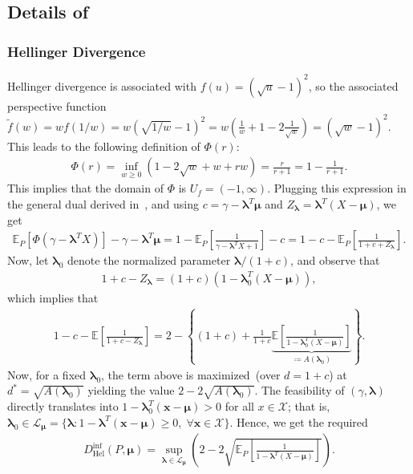 \documentclass{article}
\theoremstyle{plain}
\theoremstyle{definition}
\newcommand{\lrp}[1]{\left( #1 \right)}
\newcommand{\calX}{\mathcal X}
\newcommand{\calL}{\mathcal L}
\newcommand{\xvec}{\mathbf{x}}
\newcommand{\boldlambda}{\boldsymbol{\lambda}}
\newcommand{\boldmu}{\boldsymbol{\mu}}
\newcommand{\ftilde}{\widetilde{f}}
\begin{document}
\subsection{Details of }
\label{proof:corollary-f-divergence}

\subsubsection{Hellinger Divergence}
\label{proof:corollary-Hellinger}
Hellinger divergence is associated with $f(u) = (\sqrt{u} - 1)^2$, so the associated perspective function $\ftilde(w) = w f(1/w) = w (\sqrt{1/w} - 1)^2 = w \lrp{\frac 1 w + 1 - 2 \frac 1 {\sqrt{w}} } = (\sqrt{w} -1)^2$. This leads to the following definition of $\Phi(r)$: 
\begin{align}
    \Phi(r) = \inf_{w \geq 0} \lrp{1 - 2 \sqrt{w} + w + rw } = \frac{r}{r+1} = 1 - \frac{1}{r+1}.  
\end{align}
This implies that the domain of $\Phi$ is $U_f = (-1, \infty)$. Plugging this expression in the general dual derived in~, and using $c = \gamma - \boldlambda^T \boldmu$ and $Z_{\boldlambda} = \boldlambda^T(X-\boldmu)$, we get 
\begin{align}
    \mathbb{E}_P[\Phi(\gamma - \boldlambda^T X)] - \gamma - \boldlambda^T \boldmu = 1 - \mathbb{E}_P\left[ \frac{1}{\gamma - \boldlambda^T X + 1} \right] - c = 1 - c - \mathbb{E}_P\left[ \frac{1}{1 + c + Z_{\boldlambda}} \right].
\end{align}
Now, let $\boldlambda_0$ denote the normalized parameter $\boldlambda/(1+c)$, and observe that 
\begin{align}
    1 + c - Z_{\boldlambda} = (1+c) \lrp{ 1 - \boldlambda_0^T(X - \boldmu)}, 
\end{align}
which implies that 
\begin{align}
    1 - c - \mathbb{E}\left[ \frac{1}{1 + c - Z_{\boldlambda}} \right] = 2 - \left\{ (1+c) + \frac{1}{1+c} \underbrace{\mathbb{E}\left[ \frac{1}{1 - \boldlambda_0^T(X-\boldmu)} \right]}_{\coloneqq A(\boldlambda_0)} \right\}. 
\end{align}
Now, for a fixed $\boldlambda_0$, the term above is maximized~(over $d = 1+c$) at $d^* = \sqrt{A(\boldlambda_0)}$ yielding the value $2 - 2 \sqrt{A(\boldlambda_0)}$. The feasibility of $(\gamma, \boldlambda)$ directly translates into $1-\boldlambda_0^T(\xvec - \boldmu) > 0$ for all $x \in \calX$; that is, $\boldlambda_0 \in \calL_{\boldmu} = \{\boldlambda: 1-\boldlambda^T(\xvec - \boldmu) \geq 0, \; \forall \xvec \in \calX\}$.  Hence, we get the required 
\begin{align}
 D_{\mathrm{Hel}}^{\inf}(P, \boldmu)  = \sup_{\boldlambda \in \calL_{\boldmu}}  \lrp{ 2 -  2\sqrt{\mathbb{E}_P\left[ \frac{1}{1 - \boldlambda^T(X-\boldmu)  }  \right] }}. 
\end{align}
\end{document}
